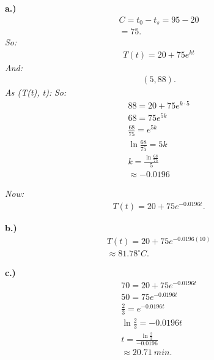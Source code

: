 \documentclass{report}
\begin{document}
    \bigbreak \noindent 
    \textbf{a.)}
    \begin{align*}
      C = t_0 - t_s  = 95-20 \\
      = 75
    .\end{align*}
    \bigbreak \noindent
    \textit{So:}
    \begin{align*}
      T(t) = 20 + 75e^{kt}
    \end{align*}
    \bigbreak \noindent 
    \textit{And:}
    \begin{align*}
      (5, 88)
    .\end{align*}
    \bigbreak \noindent 
    \textit{As (T(t), t):}
    \bigbreak \noindent
    \textit{So:}
    \begin{align*}
      88 = 20 + 75e^{k \cdot 5} \\
      68 = 75e^{5k} \\ 
      \frac{68}{75} = e^{5k} \\
      \ln{\frac{68}{75}} = 5k \\
      k = \frac{\ln{\frac{68}{75}}}{5} \\
      \approx -0.0196
    \end{align*}

    \bigbreak \noindent 
    \textit{Now:}
    \begin{align*}
      T(t) = 20 + 75e^{-0.0196t}
    .\end{align*}

    \bigbreak \noindent
    \textbf{b.)}
    \begin{align*}
      T(t) = 20 + 75e^{-0.0196(10)} \\ 
      \approx 81.78^{\circ}C
    .\end{align*}

    \bigbreak \noindent 
    \textbf{c.)}
    \begin{align*}
      70 = 20 + 75e^{-0.0196t} \\
      50 = 75e^{-0.0196t} \\
      \frac{2}{3} = e^{-0.0196t} \\
      \ln{\frac{2}{3}} = -0.0196t \\
      t = \frac{\ln{\frac{2}{3}}}{-0.0196} \\
      \approx 20.71\ min
    .\end{align*}
\end{document}
